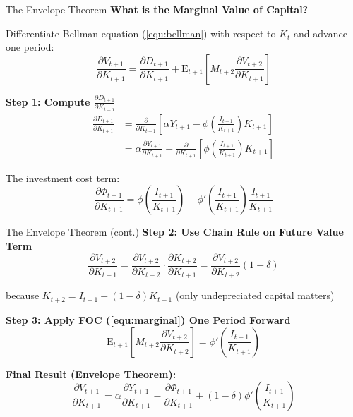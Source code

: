 \documentclass{beamer}
\begin{document}
\begin{frame}{The Envelope Theorem}
    \textbf{What is the Marginal Value of Capital?}
    
    Differentiate Bellman equation (\ref{equ:bellman}) with respect to $K_t$ and advance one period:
    \begin{equation}\label{equ:envelope}
        \frac{\partial V_{t+1}}{\partial K_{t+1}} = \frac{\partial D_{t+1}}{\partial K_{t+1}} + \mathrm{E}_{t+1}\left[M_{t+2} \frac{\partial V_{t+2}}{\partial K_{t+1}}\right]
    \end{equation}
    
    \textbf{Step 1: Compute $\frac{\partial D_{t+1}}{\partial K_{t+1}}$}
    \begin{equation*}
        \begin{aligned}
            \frac{\partial D_{t+1}}{\partial K_{t+1}} &= \frac{\partial}{\partial K_{t+1}}\left[\alpha Y_{t+1} - \phi\left(\frac{I_{t+1}}{K_{t+1}}\right) K_{t+1}\right] \\
            &= \alpha \frac{\partial Y_{t+1}}{\partial K_{t+1}} - \frac{\partial}{\partial K_{t+1}}\left[\phi\left(\frac{I_{t+1}}{K_{t+1}}\right) K_{t+1}\right]
        \end{aligned}
    \end{equation*}
    
    The investment cost term:
    \begin{equation*}
        \frac{\partial \Phi_{t+1}}{\partial K_{t+1}} = \phi\left(\frac{I_{t+1}}{K_{t+1}}\right) - \phi'\left(\frac{I_{t+1}}{K_{t+1}}\right) \frac{I_{t+1}}{K_{t+1}}
    \end{equation*}
\end{frame}

\begin{frame}{The Envelope Theorem (cont.)}
    \textbf{Step 2: Use Chain Rule on Future Value Term}
    \begin{equation*}
        \frac{\partial V_{t+2}}{\partial K_{t+1}} = \frac{\partial V_{t+2}}{\partial K_{t+2}} \cdot \frac{\partial K_{t+2}}{\partial K_{t+1}} = \frac{\partial V_{t+2}}{\partial K_{t+2}} (1-\delta)
    \end{equation*}
    
    because $K_{t+2} = I_{t+1} + (1-\delta)K_{t+1}$ (only undepreciated capital matters)
    
    
    \textbf{Step 3: Apply FOC (\ref{equ:marginal}) One Period Forward}
    \begin{equation*}
        \mathrm{E}_{t+1}\left[M_{t+2} \frac{\partial V_{t+2}}{\partial K_{t+2}}\right] = \phi'\left(\frac{I_{t+1}}{K_{t+1}}\right)
    \end{equation*}
    
    
    \textbf{Final Result (Envelope Theorem):}
    \begin{equation}\label{equ:envelope theorem}
        \boxed{
        \frac{\partial V_{t+1}}{\partial K_{t+1}} = \alpha \frac{\partial Y_{t+1}}{\partial K_{t+1}} - \frac{\partial \Phi_{t+1}}{\partial K_{t+1}} + (1-\delta) \phi'\left(\frac{I_{t+1}}{K_{t+1}}\right)
        }
    \end{equation}
\end{frame}
\end{document}
